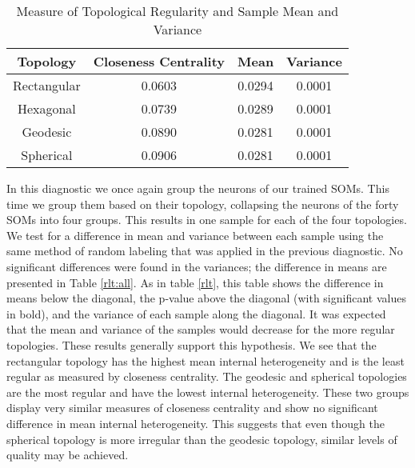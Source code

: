 \begin{table}
\begin{minipage}{\textwidth}
\caption{Measure of Topological Regularity and Sample Mean and Variance}
\label{vardeg}
\begin{tabular}{|c||c|c|c|}
\hline
Topology & Closeness Centrality & Mean & Variance\\
\hline
Rectangular & 0.0603 & 0.0294 &0.0001\\
Hexagonal & 0.0739 & 0.0289 &0.0001\\
Geodesic & 0.0890 & 0.0281 &0.0001\\
Spherical & 0.0906 & 0.0281 &0.0001\\
\hline
\end{tabular}
\end{minipage}
\end{table}

In this diagnostic we once again group the neurons of our trained SOMs. This
time we group them based on their topology, collapsing the neurons of the
forty SOMs into four groups.  This results in one sample for each of the four
topologies.  We test for a
difference in mean and variance between each sample using the same method of
random labeling that was applied in the previous diagnostic.  No significant
differences were found in the variances; the difference in means are presented
in Table \ref{rlt:all}.  As in table \ref{rlt}, this table shows the
difference in means below the diagonal, the p-value above the diagonal (with
significant values in bold), and the variance of each sample along the
diagonal.  It was expected that the mean and variance of the
samples would decrease for the more regular topologies.  These results
generally support this hypothesis. We see that the rectangular topology has
the highest mean internal heterogeneity and is the least regular as measured by
closeness centrality. The geodesic and spherical topologies are the most
regular and have the lowest internal heterogeneity. These two groups display very
similar measures of closeness centrality and show no significant difference in
mean internal heterogeneity.  This suggests that even though the spherical topology
is more irregular than the geodesic topology, similar levels of quality may be
achieved.


